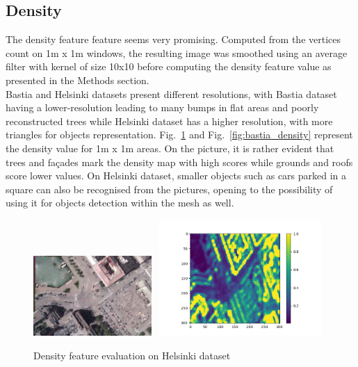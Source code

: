 \documentclass{kththesis}
\begin{document}
\subsection{Density}
The density feature feature seems very promising.  Computed from the vertices count on 1m x 1m windows, the resulting image was smoothed using an average filter with kernel of size 10x10 before computing the density feature value as presented in the Methods section. \\
Bastia and Helsinki datasets present different resolutions, with Bastia dataset having a lower-resolution leading to many bumps in flat areas and poorly reconstructed trees while Helsinki dataset has a higher resolution, with more triangles for objects representation. Fig.~\ref{fig:hels_density} and Fig.~\ref{fig:bastia_density} represent the density value for 1m x 1m areas. On the picture, it is rather evident that trees and façades mark the density map with high scores while grounds and roofs score lower values. On Helsinki dataset, smaller objects such as cars parked in a square can also be recognised from the pictures, opening to the possibility of using it for objects detection within the mesh as well. 
\begin{figure}[H]
    \centering
    \includegraphics[width=0.40\textwidth]{images/features/helsinki_tree.png} ~\includegraphics[width=0.55\textwidth]{images/features/density_helsinki_tree.png}
    \caption{Density feature evaluation on Helsinki dataset}
    \label{fig:hels_density}
\end{figure}
\end{document}
